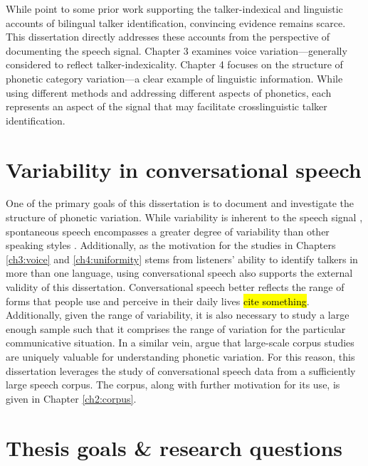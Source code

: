 While \citet{orena_2019_identifying} point to some prior work supporting the talker-indexical and linguistic accounts of bilingual talker identification, convincing evidence remains scarce. This dissertation directly addresses these accounts from the perspective of documenting the speech signal. Chapter 3 examines voice variation---generally considered to reflect talker-indexicality. Chapter 4 focuses on the structure of phonetic category variation---a clear example of linguistic information. While using different methods and addressing different aspects of phonetics, each represents an aspect of the signal that may facilitate crosslinguistic talker identification. 

\section{Variability in conversational speech}\label{ch1:sec:spontaneous}

One of the primary goals of this dissertation is to document and investigate the structure of phonetic variation. While variability is inherent to the speech signal \citep[cf. the lack of invariance problem][]{liberman_1967_perception}, spontaneous speech encompasses a greater degree of variability than other speaking styles \citep[e.g., reduction phenomena:][]{johnson_2004_massive}. Additionally, as the motivation for the studies in Chapters \ref{ch3:voice} and \ref{ch4:uniformity} stems from listeners' ability to identify talkers in more than one language, using conversational speech also supports the external validity of this dissertation. Conversational speech better reflects the range of forms that people use and perceive in their daily lives \hl{cite something}. Additionally, given the range of variability, it is also necessary to study a large enough sample such that it comprises the range of variation for the particular communicative situation. In a similar vein, \citet{tanner_2020_english} argue that large-scale corpus studies are uniquely valuable for understanding phonetic variation. For this reason, this dissertation leverages the study of conversational speech data from a sufficiently large speech corpus. The corpus, along with further motivation for its use, is given in Chapter \ref{ch2:corpus}.

\section{Thesis goals \& research questions}\label{ch1:sec:goals}

